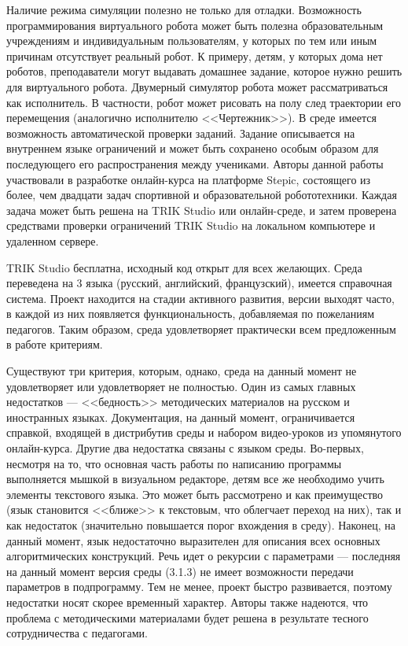 \documentclass[a5paper]{article}
\begin{document}
Наличие режима симуляции полезно не только для отладки. Возможность программирования виртуального робота может 
быть полезна образовательным учреждениям и индивидуальным пользователям, у которых по тем или иным причинам 
отсутствует реальный робот. К примеру, детям, у которых дома нет роботов, преподаватели могут выдавать домашнее 
задание, которое нужно решить для виртуального робота. Двумерный симулятор робота может рассматриваться как 
исполнитель. В частности, робот может рисовать на полу след траектории его перемещения (аналогично исполнителю 
<<Чертежник>>). В среде имеется возможность автоматической проверки заданий. Задание описывается на внутреннем 
языке ограничений и может быть сохранено особым образом для последующего его распространения между учениками. 
Авторы данной работы участвовали в разработке онлайн-курса на платформе Stepic, состоящего из более, чем двадцати 
задач спортивной и образовательной робототехники. Каждая задача может быть решена на TRIK Studio или онлайн-среде, 
и затем проверена средствами проверки ограничений TRIK Studio на локальном компьютере и удаленном сервере.

TRIK Studio бесплатна, исходный код открыт для всех желающих. Среда переведена на 3 языка (русский, английский, 
французский), имеется справочная система. Проект находится на стадии активного развития, версии выходят часто, 
в каждой из них появляется функциональность, добавляемая по пожеланиям педагогов. Таким образом, среда 
удовлетворяет практически всем предложенным в работе критериям. 

Существуют три критерия, которым, однако, среда на данный момент не удовлетворяет или удовлетворяет не полностью. 
Один из самых главных недостатков --- <<бедность>> методических материалов на русском и иностранных языках. 
Документация, на данный момент, ограничивается справкой, входящей в дистрибутив среды и набором видео-уроков 
из упомянутого онлайн-курса. Другие два недостатка связаны с языком среды. Во-первых, несмотря на то, 
что основная часть работы по написанию программы выполняется мышкой в визуальном редакторе, детям все же 
необходимо учить элементы текстового языка. Это может быть рассмотрено и как преимущество (язык становится 
<<ближе>> к текстовым, что облегчает переход на них), так и как недостаток (значительно повышается порог 
вхождения в среду). Наконец, на данный момент, язык недостаточно выразителен для описания всех основных 
алгоритмических конструкций. Речь идет о рекурсии с параметрами --- последняя на данный момент версия среды 
(3.1.3) не имеет возможности передачи параметров в подпрограмму. Тем не менее, проект быстро развивается, 
поэтому недостатки носят скорее временный характер. Авторы также надеются, что проблема с методическими 
материалами будет решена в результате тесного сотрудничества с педагогами.
\end{document}

